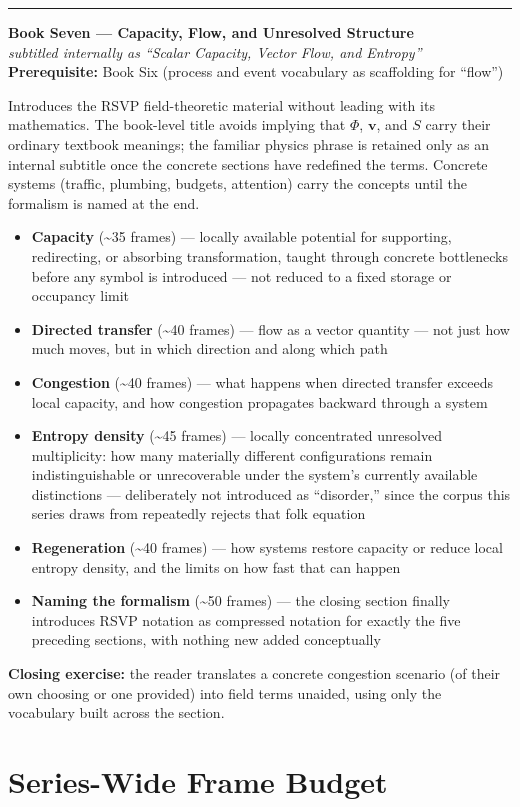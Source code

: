 \documentclass[11pt]{article}
\newenvironment{bookentry}[3]{%
  \par\noindent\rule{\linewidth}{0.5pt}\par\vspace{0.5em}
  {\Large\bfseries #1}\\[0.15em]
  {\itshape\large #2}\\[0.3em]
  {\small\textbf{Prerequisite:} #3}\par\vspace{0.6em}
}{\par\vspace{0.8em}}
\newenvironment{sectionlist}{%
  \begin{itemize}[leftmargin=1.4em, itemsep=0.45em, topsep=0.3em]
}{%
  \end{itemize}
}
\newcommand{\secitem}[3]{\item \textbf{#1} (\textasciitilde#2 frames) --- #3}
\begin{document}
\begin{bookentry}{Book Seven --- Capacity, Flow, and Unresolved Structure}{subtitled internally as ``Scalar Capacity, Vector Flow, and Entropy''}{Book Six (process and event vocabulary as scaffolding for ``flow'')}
Introduces the RSVP field-theoretic material without leading with its mathematics. The book-level title avoids implying that $\Phi$, $\mathbf{v}$, and $S$ carry their ordinary textbook meanings; the familiar physics phrase is retained only as an internal subtitle once the concrete sections have redefined the terms. Concrete systems (traffic, plumbing, budgets, attention) carry the concepts until the formalism is named at the end.

\begin{sectionlist}
\secitem{Capacity}{35}{locally available potential for supporting, redirecting, or absorbing transformation, taught through concrete bottlenecks before any symbol is introduced --- not reduced to a fixed storage or occupancy limit}
\secitem{Directed transfer}{40}{flow as a vector quantity --- not just how much moves, but in which direction and along which path}
\secitem{Congestion}{40}{what happens when directed transfer exceeds local capacity, and how congestion propagates backward through a system}
\secitem{Entropy density}{45}{locally concentrated unresolved multiplicity: how many materially different configurations remain indistinguishable or unrecoverable under the system's currently available distinctions --- deliberately not introduced as ``disorder,'' since the corpus this series draws from repeatedly rejects that folk equation}
\secitem{Regeneration}{40}{how systems restore capacity or reduce local entropy density, and the limits on how fast that can happen}
\secitem{Naming the formalism}{50}{the closing section finally introduces RSVP notation as compressed notation for exactly the five preceding sections, with nothing new added conceptually}
\end{sectionlist}
\textbf{Closing exercise:} the reader translates a concrete congestion scenario (of their own choosing or one provided) into field terms unaided, using only the vocabulary built across the section.
\end{bookentry}

\section*{Series-Wide Frame Budget}
\end{document}
